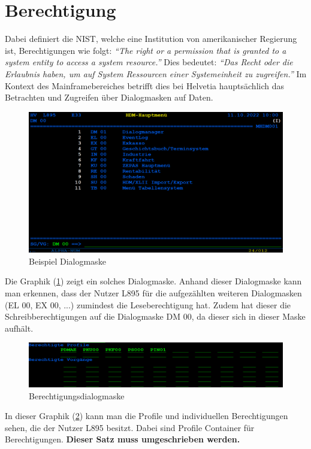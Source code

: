 \section{Berechtigung}
\label{sec:Berechtigung}
Dabei definiert die \ac{NIST}, welche eine Institution von amerikanischer Regierung ist, Berechtigungen wie folgt:
\newline
\newline
\textit{"`The right or a permission that is granted to a system entity to access a system resource."'} \cite{Auth}
\newline
\newline
Dies bedeutet:
\newline
\newline
\textit{"`Das Recht oder die Erlaubnis haben, um auf System Ressourcen einer Systemeinheit zu zugreifen."'} \cite{Mainframe}
\newline
\newline
Im Kontext des Mainframebereiches betrifft dies bei Helvetia hauptsächlich das Betrachten und Zugreifen über Dialogmasken auf Daten.
\begin{figure}[h!]
 \centering
 \includegraphics[width=1\textwidth]{gfx/Picture/Dialog.PNG}
 \caption{Beispiel Dialogmaske}
 \label{fig:Dial}
\end{figure}
Die Graphik (\ref{fig:Dial}) zeigt ein solches Dialogmaske.
Anhand dieser Dialogmaske kann man erkennen, dass der Nutzer L895 für die aufgezählten weiteren Dialogmasken (EL 00, EX 00, ...) zumindest die Leseberechtigung hat.
Zudem hat dieser die Schreibberechtigungen auf die Dialogmaske DM 00, da dieser sich in dieser Maske aufhält. 
\newline
\newline
\begin{figure}[h!]
 \centering
 \includegraphics[width=1\textwidth]{gfx/Picture/Berechtigung.PNG}
 \caption{Berechtigungsdialogmaske}
 \label{fig:Berch}
\end{figure}
In dieser Graphik (\ref{fig:Berch}) kann man die Profile und individuellen Berechtigungen sehen, die der Nutzer L895 besitzt.
Dabei sind Profile Container für Berechtigungen.  \textbf{\textcolor[rgb]{1,0,0}{Dieser Satz muss umgeschrieben werden.}}

